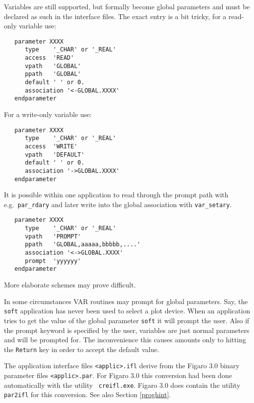Variables are still supported, but formally become global parameters and
must be declared as such in the interface files. The exact entry is a
bit tricky, for a read-only variable use:

\goodbreak
\begin{verbatim}
   parameter XXXX
      type    '_CHAR' or '_REAL'
      access  'READ'
      vpath   'GLOBAL'
      ppath   'GLOBAL'
      default ' ' or 0.
      association '<-GLOBAL.XXXX'
   endparameter
\end{verbatim}
\goodbreak

For a write-only variable use:

\goodbreak
\begin{verbatim}
   parameter XXXX
      type    '_CHAR' or '_REAL'
      access  'WRITE'
      vpath   'DEFAULT'
      default ' ' or 0.
      association '->GLOBAL.XXXX'
   endparameter
\end{verbatim}
\goodbreak

It is possible within one application to read through the prompt path
with e.g.\ {\tt par\_rdary} and later write into the global association
with {\tt var\_setary}.

\begin{verbatim}
   parameter XXXX
      type    '_CHAR' or '_REAL'
      vpath   'PROMPT'                        
      ppath   'GLOBAL,aaaaa,bbbbb,....'
      association '<->GLOBAL.XXXX'
      prompt  'yyyyyy'
   endparameter
\end{verbatim}

More elaborate schemes may prove difficult.

In some circumstances VAR routines may prompt for global parameters.
Say, the {\tt soft} application has never been used to select a plot device.
When an application tries to get the value of the global parameter {\tt soft}
it will prompt the user. Also if the prompt keyword is specified by the
user, variables are just normal parameters and will be prompted for. The
inconvenience this causes amounts only to hitting the {\tt Return} key
in order to accept the default value.

The application interface files {\tt <applic>.ifl} derive from the
Figaro 3.0 binary parameter files {\tt <applic>\-.par}. For Figaro 3.0
this conversion had been done automatically with the utility {\tt
creifl.exe}.  Figaro 3.0 does contain the utility {\tt par2ifl} for this
conversion.  See also Section \ref{proghint}.

